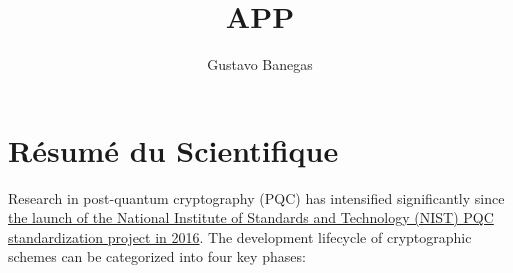 \documentclass[11pt, a4paper]{article}
\begin{document}
\title{APP}
\author{Gustavo Banegas}
\date{}
\maketitle

\section{Résumé du Scientifique}


Research in post-quantum cryptography (PQC) has intensified 
significantly since 
\href{https://csrc.nist.gov/projects/post-quantum-cryptography/post-quantum-cryptography-standardization/call-for-proposals}
{the launch of the National Institute of Standards and Technology (NIST) PQC standardization project in 2016}. 
The development lifecycle of cryptographic schemes can be 
categorized into four key phases:
\end{document}
